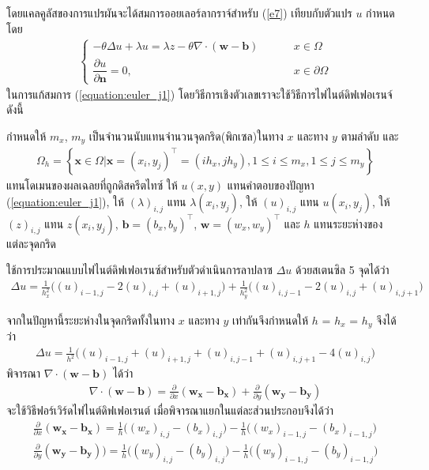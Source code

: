 \hspace{1cm}  โดยแคลคูลัสของการแปรผันจะได้สมการออยเลอร์ลากราจ์สำหรับ (\ref{e7}) เทียบกับตัวแปร $u$ กำหนดโดย
\begin{align}
\left \{ \begin{array}{ll}   - \theta \Delta u + \lambda u = \lambda z - \theta \nabla \cdot (\boldsymbol{w}-\boldsymbol{b}) & \hspace{1cm} x \in  \Omega 	 \\
 \dfrac{\partial u}{\partial \boldsymbol{n}} = 0, & \hspace{1cm} x \in \partial \Omega \end{array} \right . 
 \label{equation:euler_j1}
\end{align}
\hspace{1cm} ในการแก้สมการ (\ref{equation:euler_j1}) โดยวิธีการเชิงตัวเลขเราจะใช้วิธีการไฟไนต์ดิฟเฟอเรนจ์ดังนี้

\hspace{1cm} กำหนดให้ $m_x$, $m_y$ เป็นจำนวนนับแทนจำนวนจุดกริด(พิกเซล)ในทาง $x$ และทาง $y$ ตามลำดับ และ
\begin{align*}
	\Omega_{h}=\left\{ \mathbf{x} \in \Omega | \mathbf{x}=(x_i,y_j)^{\top} = (ih_x,jh_y), 1 \leq i \leq m_x, 1 \leq j \leq m_y  \right\}
\end{align*}
แทนโดเมนของผลเฉลยที่ถูกดิสครีตไทซ์ ให้ $u(x,y)$ แทนคำตอบของปัญหา  (\ref{equation:euler_j1}), ให้ $(\lambda)_{i,j}$ แทน $\lambda(x_i,y_j)$,   ให้ $(u)_{i,j}$ แทน $u(x_i,y_j)$, ให้ $(z)_{i,j}$ แทน $z(x_i,y_j)$, $\boldsymbol{b} = (b_x,b_y)^\top$, $\boldsymbol{w}=(w_x,w_y)^\top$ และ $h$ แทนระยะห่างของแต่ละจุดกริด 

ใช้การประมาณแบบไฟไนต์ดิฟเฟอเรนซ์สำหรับตัวดำเนินการลาปลาซ $\Delta u$ ด้วยสเตนซิล 5 จุดได้ว่า
\begin{align}
	\Delta u = \frac{1}{h_x^2} \big( (u)_{i-1,j} - 2(u)_{i,j} + (u)_{i+1,j}\big) + \frac{1}{h_y^2} \big( (u)_{i,j-1} - 2(u)_{i,j} + (u)_{i,j+1}\big)
\end{align}

จากในปัญหานี้ระยะห่างในจุดกริดทั้งในทาง $x$ และทาง $y$ เท่ากันจึงกำหนดให้ $h$ = $h_x$ = $h_y$ จึงได้ว่า
\begin{align}
	\Delta u = \frac{1}{h^2} \big( (u)_{i-1,j} + (u)_{i+1,j} + (u)_{i,j-1} +  (u)_{i,j+1} - 4(u)_{i,j} \big)
\end{align}
พิจารณา $\nabla \cdot (\boldsymbol{w}-\boldsymbol{b})$ ได้ว่า
\begin{align}
	\nabla \cdot (\boldsymbol{w}-\boldsymbol{b}) = \frac{\partial}{\partial x} (\boldsymbol{w_x}-\boldsymbol{b_x}) + \frac{\partial}{\partial y} (\boldsymbol{w_y}-\boldsymbol{b_y}) 
\end{align}
จะใช้วิธีฟอร์เวิร์ดไฟไนต์ดิฟเฟอเรนต์ เมื่อพิจารณาแยกในแต่ละส่วนประกอบจึงได้ว่า
\begin{align}
	\frac{\partial}{\partial x} (\boldsymbol{w_x}-\boldsymbol{b_x})  =  \frac{1}{h} \Big((w_x)_{i,j}-(b_x)_{i,j}\Big) - \frac{1}{h} \Big((w_x)_{i-1,j}-(b_x)_{i-1,j}\Big)  \\ 
	\frac{\partial}{\partial y} (\boldsymbol{w_y}-\boldsymbol{b_y}) )  =  \frac{1}{h} \Big((w_y)_{i,j}-(b_y)_{i,j}\Big) - \frac{1}{h} \Big((w_y)_{i-1,j}-(b_y)_{i-1,j}\Big) 
\end{align}


